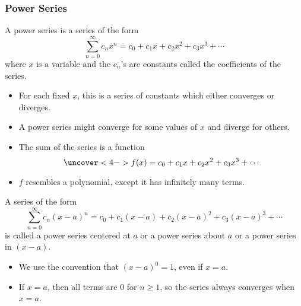 \begin{frame}
\frametitle{Power Series}
\begin{definition}
A power series is a series of the form
\abovedisplayskip=0pt
\belowdisplayskip=0pt
\[
\sum_{n=0}^\infty c_n x^n = c_0 + c_1 x + c_2 x^2 + c_3x^3 + \cdots%
\]
where $x$ is a variable and the $c_n$'s are constants called the coefficients of the series.
\end{definition}
\begin{itemize}
\item<2->  For each fixed $x$, this is a series of constants which either converges or diverges.
\item<3->  A power series might converge for some values of $x$ and diverge for others.
\item<4->  The sum of the series is a function
\abovedisplayskip=0pt
\belowdisplayskip=0pt
\[
\uncover<4->{%
f(x) = c_0 + c_1x + c_2x^2 + c_3x^3 + \cdots %
}%
\]
\item<5->  $f$ resembles a polynomial, except it has infinitely many terms.
\end{itemize}
\end{frame}

\begin{frame}
\begin{definition}
A series of the form
\abovedisplayskip=0pt
\belowdisplayskip=0pt
\[
\sum_{n=0}^\infty c_n (x-a)^n = c_0 + c_1 (x-a) + c_2 (x-a)^2 + c_3(x-a)^3 + \cdots%
\]
is called a power series centered at $a$ or a power series about $a$ or a power series in $(x-a)$.
\end{definition}
\begin{itemize}
\item<2->  We use the convention that $(x-a)^0 = 1$, even if $x = a$.
\item<3->  If $x = a$, then all terms are $0$ for $n \geq 1$, so the series always converges when $x = a$.
\end{itemize}
\end{frame}
